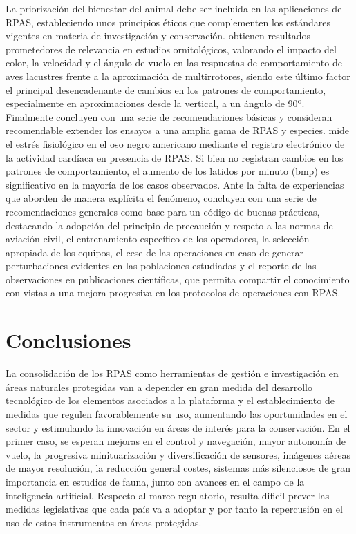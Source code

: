 \documentclass[twocolumn]{extarticle}
\begin{document}
La priorización del bienestar del animal debe ser incluida en las
aplicaciones de RPAS, estableciendo unos principios éticos que
complementen los estándares vigentes en materia de investigación y
conservación. \citep{Vas2015} obtienen resultados prometedores de
relevancia en estudios ornitológicos, valorando el impacto del color, la
velocidad y el ángulo de vuelo en las respuestas de comportamiento de
aves lacustres frente a la aproximación de multirrotores, siendo este
último factor el principal desencadenante de cambios en los patrones de
comportamiento, especialmente en aproximaciones desde la vertical, a un
ángulo de 90º. Finalmente concluyen con una serie de recomendaciones
básicas y consideran recomendable extender los ensayos a una amplia gama
de RPAS y especies. \citep{Ditmer2015} mide el estrés fisiológico en el
oso negro americano mediante el registro electrónico de la actividad
cardíaca en presencia de RPAS. Si bien no registran cambios en los
patrones de comportamiento, el aumento de los latidos por minuto (bmp)
es significativo en la mayoría de los casos observados. Ante la falta de
experiencias que aborden de manera explícita el fenómeno,
\citep{Hodgson2016a} concluyen con una serie de recomendaciones
generales como base para un código de buenas prácticas, destacando la
adopción del principio de precaución y respeto a las normas de aviación
civil, el entrenamiento específico de los operadores, la selección
apropiada de los equipos, el cese de las operaciones en caso de generar
perturbaciones evidentes en las poblaciones estudiadas y el reporte de
las observaciones en publicaciones científicas, que permita compartir el
conocimiento con vistas a una mejora progresiva en los protocolos de
operaciones con RPAS.

\section{Conclusiones}\label{conclusiones}

La consolidación de los RPAS como herramientas de gestión e
investigación en áreas naturales protegidas van a depender en gran
medida del desarrollo tecnológico de los elementos asociados a la
plataforma y el establecimiento de medidas que regulen favorablemente su
uso, aumentando las oportunidades en el sector y estimulando la
innovación en áreas de interés para la conservación. En el primer caso,
se esperan mejoras en el control y navegación, mayor autonomía de vuelo,
la progresiva minituarización y diversificación de sensores, imágenes
aéreas de mayor resolución, la reducción general costes, sistemas más
silenciosos de gran importancia en estudios de fauna, junto con avances
en el campo de la inteligencia artificial. Respecto al marco
regulatorio, resulta dificil prever las medidas legislativas que cada
país va a adoptar y por tanto la repercusión en el uso de estos
instrumentos en áreas protegidas.
\end{document}
